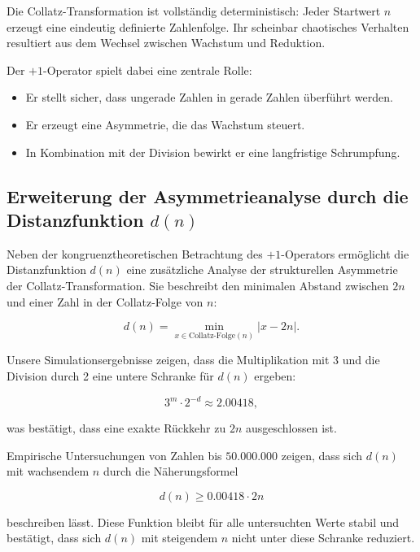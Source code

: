 \documentclass[a4paper,12pt]{article}
\begin{document}
Die Collatz-Transformation ist vollständig deterministisch: Jeder Startwert \( n \) erzeugt eine eindeutig definierte Zahlenfolge. Ihr scheinbar chaotisches Verhalten resultiert aus dem Wechsel zwischen Wachstum und Reduktion.

Der \( +1 \)-Operator spielt dabei eine zentrale Rolle:
\begin{itemize}
    \item Er stellt sicher, dass ungerade Zahlen in gerade Zahlen überführt werden.
    \item Er erzeugt eine Asymmetrie, die das Wachstum steuert.
    \item In Kombination mit der Division bewirkt er eine langfristige Schrumpfung.
\end{itemize}



\subsection{Erweiterung der Asymmetrieanalyse durch die Distanzfunktion \( d(n) \)}

Neben der kongruenztheoretischen Betrachtung des \(+1\)-Operators ermöglicht die Distanzfunktion \( d(n) \) eine zusätzliche Analyse der strukturellen Asymmetrie der Collatz-Transformation. Sie beschreibt den minimalen Abstand zwischen \( 2n \) und einer Zahl in der Collatz-Folge von \( n \):

\begin{equation}
    d(n) = \min_{x \in \text{Collatz-Folge}(n)} |x - 2n|.
\end{equation}

Unsere Simulationsergebnisse zeigen, dass die Multiplikation mit 3 und die Division durch 2 eine untere Schranke für \( d(n) \) ergeben:

\begin{equation}
    3^m \cdot 2^{-d} \approx 2.00418,
\end{equation}

was bestätigt, dass eine exakte Rückkehr zu \( 2n \) ausgeschlossen ist.

Empirische Untersuchungen von Zahlen bis \( 50.000.000 \) zeigen, dass sich \( d(n) \) mit wachsendem \( n \) durch die Näherungsformel

\begin{equation}
    d(n) \geq 0.00418 \cdot 2n
\end{equation}

beschreiben lässt. Diese Funktion bleibt für alle untersuchten Werte stabil und bestätigt, dass sich \( d(n) \) mit steigendem \( n \) nicht unter diese Schranke reduziert.
\end{document}
